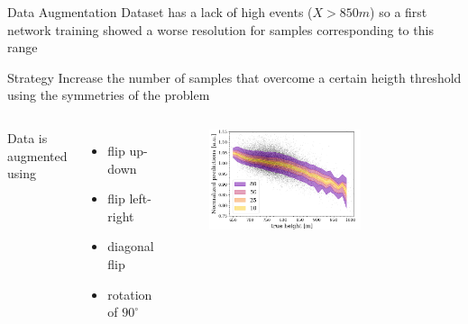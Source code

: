 \documentclass{beamer}
\begin{document}
\begin{frame}{Data Augmentation}
    Dataset has a lack of high events ($X > 850\si{m}$) so a first network training showed a worse resolution
    for samples corresponding to this range

    \begin{block}{Strategy}
        Increase the number of samples that overcome a certain heigth threshold using the
        symmetries of the problem
    \end{block}

    \begin{columns}
        Data is augmented using
    \begin{itemize}
        \item flip up-down
        \item flip left-right
        \item diagonal flip
        \item rotation of $90^{\circ}$
    \end{itemize}
    \begin{figure}
        \centering
        \includegraphics[width=0.7\textwidth]{figures/hetero1.png}
    \end{figure}
    \end{columns}
    
    

\end{frame}
\end{document}
